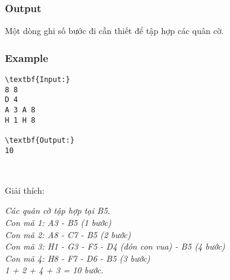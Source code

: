 \subsubsection{Output}

Một dòng ghi số bước đi cần thiết để tập hợp các quân cờ.

\subsubsection{Example}
\begin{verbatim}
\textbf{Input:}
8 8
D 4
A 3 A 8
H 1 H 8

\textbf{Output:}
10\end{verbatim}

 

Giải thích:

\emph{Các quân cờ tập hợp tại B5.
\\Con mã 1: A3 - B5 (1 bước)
\\Con mã 2: A8 - C7 - B5 (2 bước)
\\Con mã 3: H1 - G3 - F5 - D4 (đón con vua) - B5 (4 bước)
\\Con mã 4: H8 - F7 - D6 - B5 (3 bước)
\\1 + 2 + 4 + 3 = 10 bước. }
